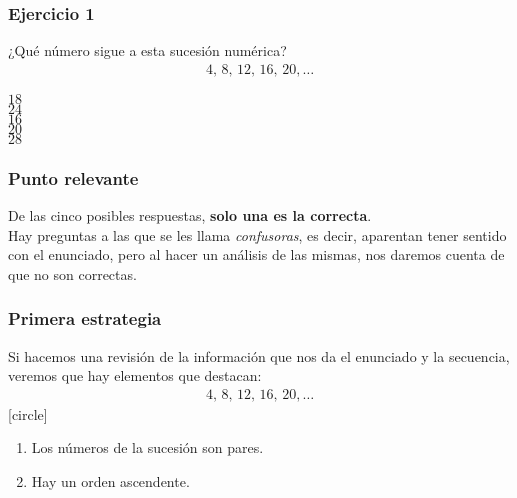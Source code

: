 \begin{frame}
\frametitle{Ejercicio 1}
¿Qué número sigue a esta sucesión numérica?
\begin{align*}
4, \, 8, \, 12, \, 16, \, 20, \ldots
\end{align*}
\begin{choices}
\choice $18$ \\
\choice $24$ \\
\choice $16$ \\
\choice $20$ \\
\choice $28$ \\
\end{choices}
\end{frame}
\begin{frame}
\frametitle{Punto relevante}
De las cinco posibles respuestas, \textbf{solo una es la correcta}.
\\
\bigskip
\pause
Hay preguntas a las que se les llama \emph{confusoras}, es decir, aparentan tener sentido con el enunciado, pero al hacer un análisis de las mismas, nos daremos cuenta de que no son correctas.
\end{frame}
\begin{frame}
\frametitle{Primera estrategia}
Si hacemos una revisión de la información que nos da el enunciado y la secuencia, veremos que hay elementos que destacan:
\pause
\begin{align*}
4, \, 8, \, 12, \, 16, \, 20, \ldots
\end{align*}
[circle]
\begin{enumerate}[<+->]
\item Los números de la sucesión son pares.
\item Hay un orden ascendente.
\end{enumerate}
\end{frame}
